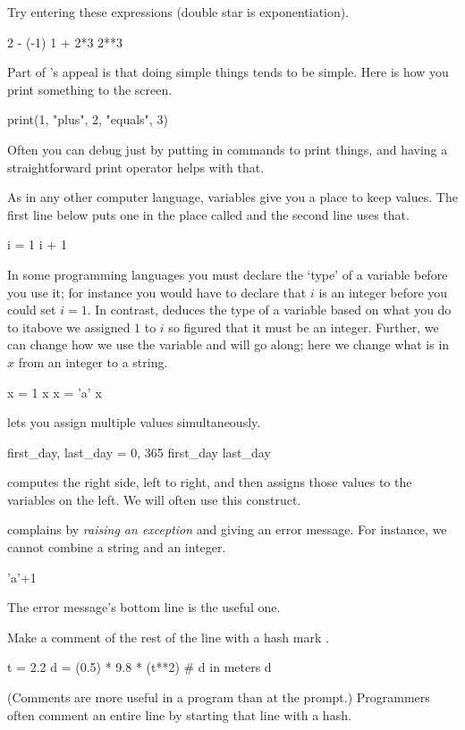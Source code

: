 Try entering these expressions (double star is exponentiation).
\begin{pyconsole}
2 - (-1)
1 + 2*3
2**3  
\end{pyconsole}

Part of \python's appeal is that doing simple things tends to be simple.
Here is how you print something to the screen.
\begin{pyconsole}
print(1, "plus", 2, "equals", 3)
\end{pyconsole}
Often you can debug just by putting in commands to print things, 
and having a straightforward print operator helps with that. 

As in any other computer language, variables give you a place to keep values.
The first line below puts one in the place called 
and the second line uses that.
\begin{pyconsole}
i = 1
i + 1
\end{pyconsole}
In some programming languages you must declare the `type' of a variable
before you use it; for instance you would have to declare 
that $i$ is an integer before you could set $i=1$.
In contrast, \python{} deduces the type of a variable 
based on what you do to it\Dash above we assigned $1$ to $i$ 
so \python{} figured that it must be an integer.
Further, we can change how we use the variable and \python{} will 
go along; here we change what is in $x$ from an integer to a string.
\begin{pyconsole}
x = 1
x
x = 'a'
x
\end{pyconsole}

\python{} lets you assign multiple values simultaneously.
\begin{pyconsole}
first_day, last_day = 0, 365
first_day
last_day   
\end{pyconsole}
\noindent
\python{} computes the right side, left to right, and then assigns 
those values to the variables on the left.
We will often use this construct.

\python{} complains by \textit{raising an exception} and giving an error 
message.
For instance, we cannot combine a string and an integer. 
\begin{pyconsole}
'a'+1
\end{pyconsole}
\noindent The error message's bottom line is the useful one.

Make a comment of the rest of the line with a hash mark \inlinecode{\#}.
\begin{pyconsole}
t = 2.2
d = (0.5) * 9.8 * (t**2)  # d in meters
d
\end{pyconsole}
\noindent (Comments are more useful in a program than at the prompt.)
Programmers often comment an entire line by starting 
that line with a hash. 


